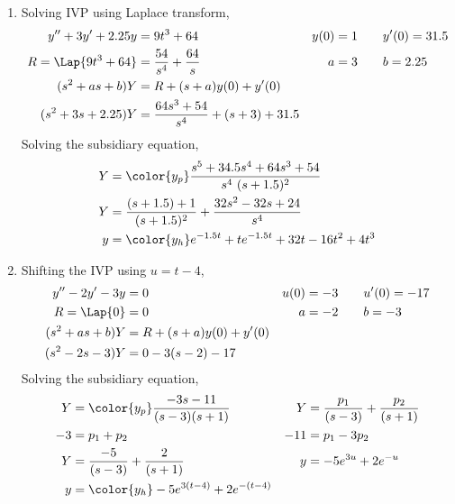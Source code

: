\begin{enumerate}
    \item Solving IVP using Laplace transform,
          \begin{align}
              y'' + 3y' + 2.25y   & = 9t^3 + 64                     &
              y(0)                & = 1 \qquad y'(0) = 31.5           \\
              R = \Lap\{9t^3+64\} & = \frac{54}{s^4} + \frac{64}{s} &
              a                   & = 3 \qquad b = 2.25               \\
              (s^2 + as + b)Y     & = R + (s+a)y(0) + y'(0)           \\
              (s^2 + 3s + 2.25)Y  & = \frac{64s^3 + 54}{s^4}
              + (s+3) + 31.5
          \end{align}
          Solving the subsidiary equation,
          \begin{align}
              Y & = \color{y_p}\frac{s^5 + 34.5s^4 + 64s^3 + 54}
              {s^4\ (s+1.5)^2}                                              \\
              Y & = \frac{(s + 1.5) + 1}{(s + 1.5)^2}
              + \frac{32s^2 - 32s + 24}{s^4}                                \\
              y & = \color{y_h} e^{-1.5t} + te^{-1.5t} + 32t - 16t^2 + 4t^3
          \end{align}

    \item Shifting the IVP using $ u = t-4 $,
          \begin{align}
              y'' - 2y' - 3y  & = 0                     &
              u(0)            & = -3 \qquad u'(0) = -17   \\
              R = \Lap\{0\}   & = 0                     &
              a               & = -2 \qquad b = -3        \\
              (s^2 + as + b)Y & = R + (s+a)y(0) + y'(0)   \\
              (s^2 - 2s - 3)Y & = 0 - 3(s-2) - 17
          \end{align}
          Solving the subsidiary equation,
          \begin{align}
              Y   & = \color{y_p}\frac{-3s - 11} {(s-3)(s+1)} &
              Y   & = \frac{p_1}{(s-3)} + \frac{p_2}{(s+1)}     \\
              -3  & = p_1 + p_2                               &
              -11 & = p_1 - 3p_2                                \\
              Y   & = \frac{-5}{(s-3)} + \frac{2}{(s+1)}      &
              y   & = -5e^{3u} + 2e^{-u}                        \\
              y   & = \color{y_h} -5e^{3(t-4)} + 2e^{-(t-4)}
          \end{align}


\end{enumerate}
